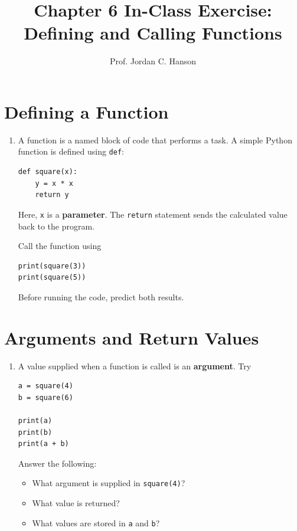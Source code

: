 \documentclass{article}
\begin{document}
\twocolumn

\title{Chapter 6 In-Class Exercise: Defining and Calling Functions}
\author{Prof. Jordan C. Hanson}
\date{}

\maketitle

\section{Defining a Function}

\begin{enumerate}

\item A function is a named block of code that performs a task.
A simple Python function is defined using \texttt{def}:

\begin{verbatim}
def square(x):
    y = x * x
    return y
\end{verbatim}

Here, \texttt{x} is a \textbf{parameter}.  The
\texttt{return} statement sends the calculated value back
to the program.

Call the function using

\begin{verbatim}
print(square(3))
print(square(5))
\end{verbatim}

Before running the code, predict both results.

\end{enumerate}


\section{Arguments and Return Values}

\begin{enumerate}

\item A value supplied when a function is called is an
\textbf{argument}.  Try

\begin{verbatim}
a = square(4)
b = square(6)

print(a)
print(b)
print(a + b)
\end{verbatim}

Answer the following:

\begin{itemize}
\item What argument is supplied in \texttt{square(4)}?
\item What value is returned?
\item What values are stored in \texttt{a} and \texttt{b}?
\end{itemize}

\end{enumerate}
\end{document}
